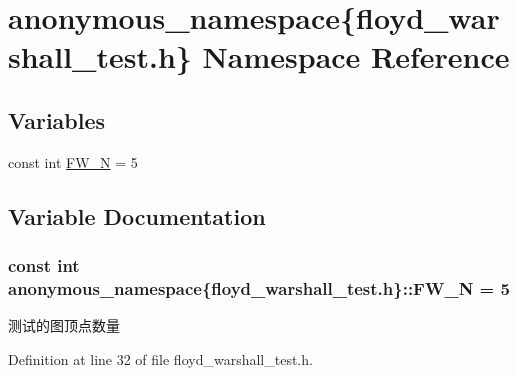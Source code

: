 \hypertarget{namespaceanonymous__namespace_02floyd__warshall__test_8h_03}{}\section{anonymous\+\_\+namespace\{floyd\+\_\+warshall\+\_\+test.\+h\} Namespace Reference}
\label{namespaceanonymous__namespace_02floyd__warshall__test_8h_03}
\subsection*{Variables}
\begin{DoxyCompactItemize}
\item 
const int \hyperlink{namespaceanonymous__namespace_02floyd__warshall__test_8h_03_afd219e5bb38e268423c836f2943fdc13}{F\+W\+\_\+\+N} = 5
\end{DoxyCompactItemize}


\subsection{Variable Documentation}
\hypertarget{namespaceanonymous__namespace_02floyd__warshall__test_8h_03_afd219e5bb38e268423c836f2943fdc13}{}
\subsubsection[{F\+W\+\_\+\+N}]{\setlength{\rightskip}{0pt plus 5cm}const int anonymous\+\_\+namespace\{floyd\+\_\+warshall\+\_\+test.\+h\}\+::F\+W\+\_\+\+N = 5}\label{namespaceanonymous__namespace_02floyd__warshall__test_8h_03_afd219e5bb38e268423c836f2943fdc13}
测试的图顶点数量 

Definition at line 32 of file floyd\+\_\+warshall\+\_\+test.\+h.

